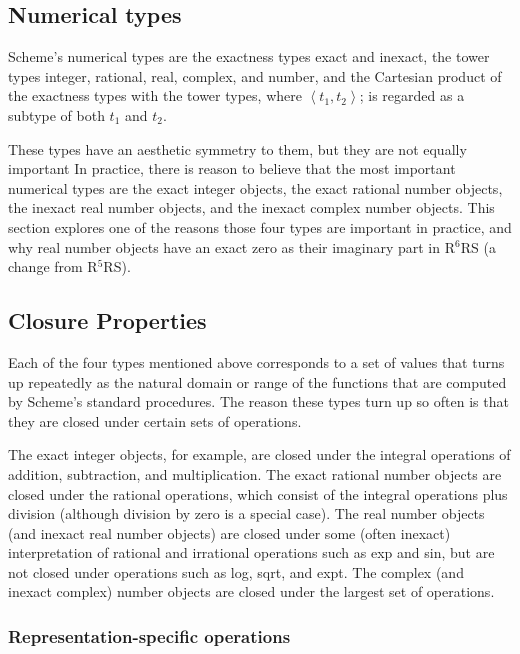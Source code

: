 \documentclass[twoside,twocolumn]{algol60}
\newcommand{\rn}[1]{R$^{#1}$RS}
\begin{document}
\subsection{Numerical types}

Scheme's numerical types are the exactness types exact and inexact,
the tower types integer, rational, real, complex, and number, and the
Cartesian product of the exactness types with the tower types, where
$\left< t_1, t_2 \right>$; is regarded as a subtype of both $t_1$ and
$t_2$.

These types have an aesthetic symmetry to them, but they are not equally
important
In practice,
there is reason to believe that the most important numerical types are
the exact integer objects, the exact rational number objects, the
inexact real number objects, and the
inexact complex number objects.  This section explores one of the reasons
those four types are important in practice, and why real number objects have an
exact zero as their imaginary part in \rn{6} (a change from \rn{5}).

\subsection{Closure Properties}
\label{closurepropertiessection}

Each of the four types mentioned above corresponds to
a set of values that turns up repeatedly as the natural domain or
range of the functions that are computed by Scheme's standard
procedures.  The reason these types turn up so often is that they are
closed under certain sets of operations.

The exact integer objects, for example, are closed under the integral
operations of addition, subtraction, and multiplication.  The exact
rational number objects are closed under the rational operations, which consist of
the integral operations plus division (although division by zero is a special
case).  The real number objects (and inexact real number objects) are closed
under some (often inexact) interpretation of rational and irrational
operations such as {\cf exp} and {\cf sin}, but are not closed under operations
such as {\cf log}, {\cf sqrt}, and {\cf expt}.  The complex (and
inexact complex) number objects are closed under the largest set of
operations.

\subsubsection{Representation-specific operations}
\end{document}
